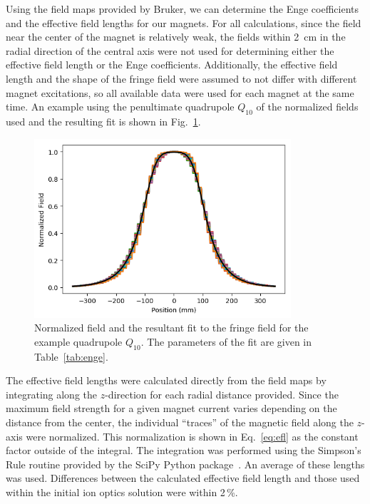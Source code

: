Using the field maps provided by Bruker, we can determine the Enge
coefficients and the effective field lengths for our magnets. For all
calculations, since the field near the center of the magnet is
relatively weak, the fields within 2~cm in the radial direction of the
central axis were not used for determining either the effective field
length or the Enge coefficients. Additionally, the effective field
length and the shape of the fringe field were assumed to not differ with
different magnet excitations, so all available data were used for each
magnet at the same time. An example using the penultimate quadrupole
$Q_{10}$ of the normalized fields used and the resulting fit is shown in
Fig.~\ref{fig:enge_fit}.

\begin{figure}[h]
    \begin{center}
        \centerline{
            \includegraphics[width=0.85\textwidth]{figures/enge_fit.png}}
        \caption[Normalized field with Enge fit]{Normalized field and
            the resultant fit to the fringe field for the example
            quadrupole $Q_{10}$. The parameters of the fit are given in
            Table~\ref{tab:enge}.}
        \label{fig:enge_fit}
    \end{center}
\end{figure}

The effective field lengths were calculated directly from the field maps
by integrating along the $z$-direction for each radial distance
provided. Since the maximum field strength for a given magnet current
varies depending on the distance from the center, the individual
``traces'' of the magnetic field along the $z$-axis were normalized.
This normalization is shown in Eq.~\ref{eq:efl} as the constant factor
outside of the integral. The integration was performed using the
Simpson's Rule routine provided by the SciPy Python
package~\cite{SciPy}. An average of these lengths was used. Differences
between the calculated effective field length and those used within the
initial ion optics solution were within 2\,\%.

